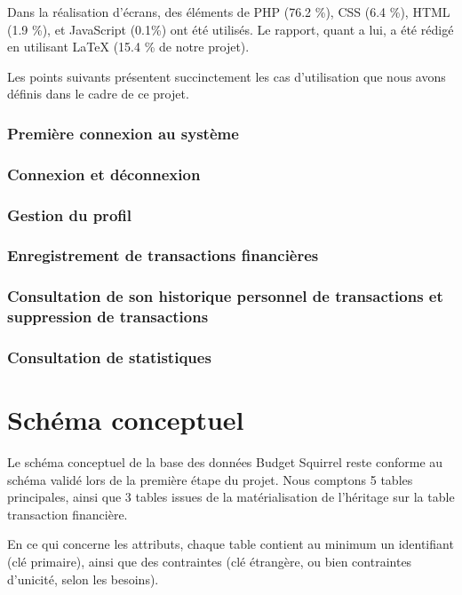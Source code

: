 \documentclass[a4paper,12pt]{article}
\begin{document}
Dans la réalisation d'écrans, des éléments de PHP (76.2 \%), CSS (6.4 \%), HTML (1.9 \%),  et JavaScript (0.1\%) ont été utilisés. Le rapport, quant a lui, a été rédigé en utilisant LaTeX (15.4 \% de notre projet).

Les points suivants présentent succinctement les cas d'utilisation que nous avons définis dans le cadre de ce projet.

\subsubsection{Première connexion au système}

\subsubsection{Connexion et déconnexion}

\subsubsection{Gestion du profil}

\subsubsection{Enregistrement de transactions financières}

\subsubsection{Consultation de son historique personnel de transactions et suppression de transactions}

\subsubsection{Consultation de statistiques}

\newpage

\section{Schéma conceptuel}

Le schéma conceptuel de la base des données Budget Squirrel reste conforme au schéma validé lors de la première étape du projet. Nous comptons 5 tables principales, ainsi que 3 tables issues de la matérialisation de l’héritage sur la table transaction financière.

En ce qui concerne les attributs, chaque table contient au minimum un identifiant (clé primaire), ainsi que des contraintes (clé étrangère, ou bien contraintes d'unicité, selon les besoins).
\end{document}
